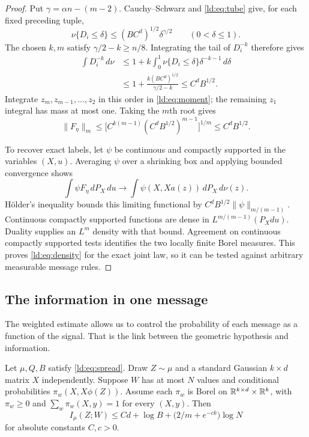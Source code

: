 \begin{proof}
Put $\gamma=\alpha n-(m-2)$. Cauchy--Schwarz and \eqref{ld:eq:tube}
give, for each fixed preceding tuple,
\[
 \nu\{D_i\le\delta\}\le(BC^d)^{1/2}\delta^{\gamma/2}
 \qquad(0<\delta\le1).
\]
The chosen $k,m$ satisfy $\gamma/2-k\ge n/8$. Integrating the tail
of $D_i^{-k}$ therefore gives
\begin{align*}
 \int D_i^{-k}\,d\nu
 &\le1+k\int_0^1\nu\{D_i\le\delta\}\delta^{-k-1}\,d\delta\\
 &\le1+\frac{k(BC^d)^{1/2}}{\gamma/2-k}
 \le C^dB^{1/2}.
\end{align*}
Integrate $z_m,z_{m-1},\ldots,z_2$ in this order in
\eqref{ld:eq:moment}; the remaining $z_1$ integral has mass at most one.
Taking the $m$th root gives
\[
 \|F_\eta\|_m
 \le\bigl[C^{k(m-1)}(C^dB^{1/2})^{m-1}\bigr]^{1/m}
 \le C^dB^{1/2}.
\]

To recover exact labels, let $\psi$ be continuous and compactly
supported in the variables $(X,u)$. Averaging $\psi$ over a shrinking
box and applying bounded convergence shows
\[
 \int\psi F_\eta\,dP_X\,du
 \longrightarrow\int\psi(X,Xa(z))\,dP_X\,d\nu(z).
\]
H\"older's inequality bounds this limiting functional by
$C^dB^{1/2}\|\psi\|_{m/(m-1)}$. Continuous compactly supported
functions are dense in $L^{m/(m-1)}(P_Xdu)$. Duality supplies an
$L^m$ density with that bound. Agreement on continuous compactly
supported tests identifies the two locally finite Borel measures.
This proves \eqref{ld:eq:density} for the exact joint law, so it can be
tested against arbitrary measurable message rules.
\end{proof}

\subsection{The information in one message}\label{ld:sec:message}

The weighted estimate allows us to control the probability of each
message as a function of the signal. That is the link between the
geometric hypothesis and information.

\begin{lemma}\label{ld:lem:block}
Let $\mu,Q,B$ satisfy \eqref{ld:eq:spread}. Draw $Z\sim\mu$ and a
standard Gaussian $k\times d$ matrix $X$ independently. Suppose $W$
has at most $N$ values and conditional probabilities
$\pi_w(X,X\phi(Z))$. Assume each $\pi_w$ is Borel on
$\mathbb R^{k\times d}\times\mathbb R^k$, with $\pi_w\ge0$ and
$\sum_w\pi_w(X,y)=1$ for every $(X,y)$.
Then
\begin{equation}\label{ld:eq:block}
 I_\mu(Z;W)\le Cd+\log B+\bigl(2/m+e^{-ck}\bigr)\log N
\end{equation}
for absolute constants $C,c>0$.
\end{lemma}

